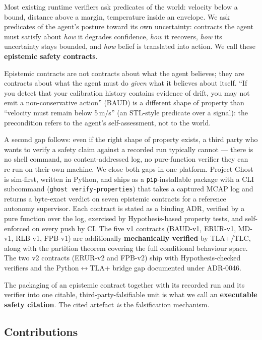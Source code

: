 \documentclass[11pt,a4paper]{article}
\begin{document}
Most existing runtime verifiers ask predicates of the world:
velocity below a bound, distance above a margin, temperature
inside an envelope. We ask predicates of the agent's posture
toward its own uncertainty: contracts the agent must satisfy
about \emph{how} it degrades confidence, \emph{how} it recovers,
\emph{how} its uncertainty stays bounded, and \emph{how} belief
is translated into action. We call these \textbf{epistemic safety
contracts}.

Epistemic contracts are not contracts about what the agent
believes; they are contracts about what the agent must do
\emph{given} what it believes about itself.
``If you detect that your calibration history contains evidence of
drift, you may not emit a non-conservative action'' (BAUD) is a
different shape of property than ``velocity must remain below
5\,m/s'' (an STL-style predicate over a signal): the precondition
refers to the agent's self-assessment, not to the world.

A second gap follows: even if the right shape of property exists,
a third party who wants to verify a safety claim against a
recorded run typically cannot --- there is no shell command, no
content-addressed log, no pure-function verifier they can re-run
on their own machine. We close both gaps in one platform. Project
Ghost is sim-first, written in Python, and ships as a
\texttt{pip}-installable package with a CLI subcommand
(\texttt{ghost verify-properties}) that takes a captured MCAP log
and returns a byte-exact verdict on seven epistemic contracts for
a reference autonomy supervisor. Each contract is stated as a
binding ADR, verified by a pure function over the log, exercised
by Hypothesis-based property tests, and self-enforced on every
push by CI. The five v1 contracts (BAUD-v1, ERUR-v1, MD-v1,
RLB-v1, FPB-v1) are additionally \textbf{mechanically verified}
by TLA+/TLC, along with the partition theorem covering the full
conditional behaviour space. The two v2 contracts (ERUR-v2 and
FPB-v2) ship with Hypothesis-checked verifiers and the
Python$\leftrightarrow$TLA+ bridge gap documented under ADR-0046.

The packaging of an epistemic contract together with its recorded
run and its verifier into one citable, third-party-falsifiable
unit is what we call an \textbf{executable safety citation}. The
cited artefact \emph{is} the falsification mechanism.

\subsection{Contributions}
\label{sec:contributions}
\end{document}
